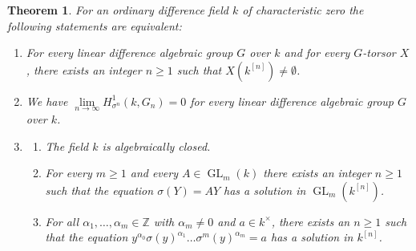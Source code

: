 \documentclass[oneside,reqno]{amsart}
\newtheorem{theo}{Theorem}[section]
\theoremstyle{definition}
\newcommand{\Gl}{\operatorname{GL}}
\newcommand{\s}{\sigma}
\newcommand{\kn}{k^{[n]}}
\begin{document}
\enlargethispage{5mm}
\begin{theo} \label{theo: main 2nd version}
	For an ordinary difference field $k$ of characteristic zero the following statements are equivalent:
\begin{enumerate}
	\item[\rm{(P1)}] For every linear difference algebraic group $G$ over $k$ and for every $G$-torsor $X$, there exists an integer $n\geq 1$ such that $X(\kn)\neq\emptyset$. 
	\item[\rm{(P2)}] We have $\lim\limits_{n\to \infty} H^1_{\s^n}(k,G_n)=0$ for every linear difference algebraic group $G$ over $k$.
		\item[\rm{(P3)}]		
	\begin{enumerate}
		\item[\rm{(a)}] The field $k$ is algebraically closed.
		\item[\rm{(b)}] For every $m\geq 1$ and every $A\in\Gl_m(k)$ there exists an integer $n\geq 1$ such that the equation $\s(Y)=AY$ has a solution in $\Gl_m(\kn)$. 	
		\item[\rm{(c)}] 
		For all $\alpha_1,\ldots,\alpha_m\in \mathbb{Z}$ with $\alpha_m\neq 0$ and $a\in k^\times$, there exists an $n\geq 1$ such that the equation $y^{\alpha_0}\s(y)^{\alpha_1}\ldots\s^m(y)^{\alpha_m}=a$
		has a solution in $\kn$.
	\end{enumerate}
\end{enumerate}
\end{theo}

\end{document}
